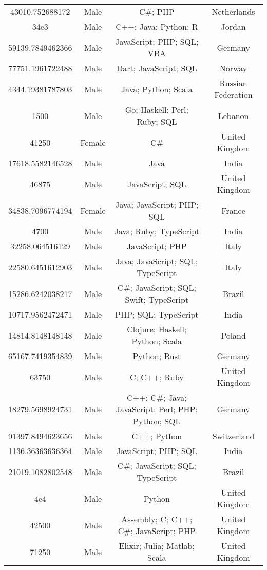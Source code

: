 \begin{center}
\begin{tabular}{ |c|c|c|c| }
43010.752688172  &  Male  &  C\#; PHP  &  Netherlands  \\ 
34e3  &  Male  &  C++; Java; Python; R  &  Jordan  \\ 
59139.7849462366  &  Male  &  JavaScript; PHP; SQL; VBA  &  Germany  \\ 
77751.1961722488  &  Male  &  Dart; JavaScript; SQL  &  Norway  \\ 
4344.19381787803  &  Male  &  Java; Python; Scala  &  Russian Federation  \\ 
1500  &  Male  &  Go; Haskell; Perl; Ruby; SQL  &  Lebanon  \\ 
41250  &  Female  &  C\#  &  United Kingdom  \\ 
17618.5582146528  &  Male  &  Java  &  India  \\ 
46875  &  Male  &  JavaScript; SQL  &  United Kingdom  \\ 
34838.7096774194  &  Female  &  Java; JavaScript; PHP; SQL  &  France  \\ 
4700  &  Male  &  Java; Ruby; TypeScript  &  India  \\ 
32258.064516129  &  Male  &  JavaScript; PHP  &  Italy  \\ 
22580.6451612903  &  Male  &  Java; JavaScript; SQL; TypeScript  &  Italy  \\ 
15286.6242038217  &  Male  &  C\#; JavaScript; SQL; Swift; TypeScript  &  Brazil  \\ 
10717.9562472471  &  Male  &  PHP; SQL; TypeScript  &  India  \\ 
14814.8148148148  &  Male  &  Clojure; Haskell; Python; Scala  &  Poland  \\ 
65167.7419354839  &  Male  &  Python; Rust  &  Germany  \\ 
63750  &  Male  &  C; C++; Ruby  &  United Kingdom  \\ 
18279.5698924731  &  Male  &  C++; C\#; Java; JavaScript; Perl; PHP; Python; SQL  &  Germany  \\ 
91397.8494623656  &  Male  &  C++; Python  &  Switzerland  \\ 
1136.36363636364  &  Male  &  JavaScript; PHP; SQL  &  India  \\ 
21019.1082802548  &  Male  &  C\#; JavaScript; SQL; TypeScript  &  Brazil  \\ 
4e4  &  Male  &  Python  &  United Kingdom  \\ 
42500  &  Male  &  Assembly; C; C++; C\#; JavaScript; PHP  &  United Kingdom  \\ 
71250  &  Male  &  Elixir; Julia; Matlab; Scala  &  United Kingdom  \\ 

\end{tabular}
\end{center}

